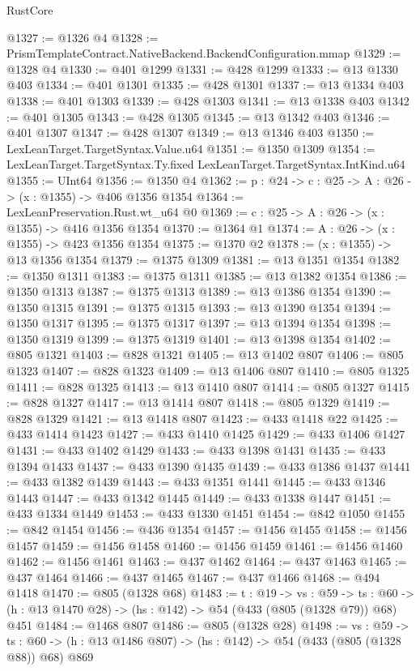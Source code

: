 \begin{lexlean}{RustCore}
\begin{coremodule}
@1327 := @1326 @4
@1328 := PrismTemplateContract.NativeBackend.BackendConfiguration.mmap
@1329 := @1328 @4
@1330 := @401 @1299
@1331 := @428 @1299
@1333 := @13 @1330 @403
@1334 := @401 @1301
@1335 := @428 @1301
@1337 := @13 @1334 @403
@1338 := @401 @1303
@1339 := @428 @1303
@1341 := @13 @1338 @403
@1342 := @401 @1305
@1343 := @428 @1305
@1345 := @13 @1342 @403
@1346 := @401 @1307
@1347 := @428 @1307
@1349 := @13 @1346 @403
@1350 := LexLeanTarget.TargetSyntax.Value.u64
@1351 := @1350 @1309
@1354 := LexLeanTarget.TargetSyntax.Ty.fixed LexLeanTarget.TargetSyntax.IntKind.u64
@1355 := UInt64
@1356 := @1350 @4
@1362 := {p : @24} -> {c : @25} -> {A : @26} -> (x : @1355) -> @406 @1356 @1354
@1364 := LexLeanPreservation.Rust.wt_u64 @0
@1369 := {c : @25} -> {A : @26} -> (x : @1355) -> @416 @1356 @1354
@1370 := @1364 @1
@1374 := {A : @26} -> (x : @1355) -> @423 @1356 @1354
@1375 := @1370 @2
@1378 := (x : @1355) -> @13 @1356 @1354
@1379 := @1375 @1309
@1381 := @13 @1351 @1354
@1382 := @1350 @1311
@1383 := @1375 @1311
@1385 := @13 @1382 @1354
@1386 := @1350 @1313
@1387 := @1375 @1313
@1389 := @13 @1386 @1354
@1390 := @1350 @1315
@1391 := @1375 @1315
@1393 := @13 @1390 @1354
@1394 := @1350 @1317
@1395 := @1375 @1317
@1397 := @13 @1394 @1354
@1398 := @1350 @1319
@1399 := @1375 @1319
@1401 := @13 @1398 @1354
@1402 := @805 @1321
@1403 := @828 @1321
@1405 := @13 @1402 @807
@1406 := @805 @1323
@1407 := @828 @1323
@1409 := @13 @1406 @807
@1410 := @805 @1325
@1411 := @828 @1325
@1413 := @13 @1410 @807
@1414 := @805 @1327
@1415 := @828 @1327
@1417 := @13 @1414 @807
@1418 := @805 @1329
@1419 := @828 @1329
@1421 := @13 @1418 @807
@1423 := @433 @1418 @22
@1425 := @433 @1414 @1423
@1427 := @433 @1410 @1425
@1429 := @433 @1406 @1427
@1431 := @433 @1402 @1429
@1433 := @433 @1398 @1431
@1435 := @433 @1394 @1433
@1437 := @433 @1390 @1435
@1439 := @433 @1386 @1437
@1441 := @433 @1382 @1439
@1443 := @433 @1351 @1441
@1445 := @433 @1346 @1443
@1447 := @433 @1342 @1445
@1449 := @433 @1338 @1447
@1451 := @433 @1334 @1449
@1453 := @433 @1330 @1451
@1454 := @842 @1050
@1455 := @842 @1454
@1456 := @436 @1354
@1457 := @1456 @1455
@1458 := @1456 @1457
@1459 := @1456 @1458
@1460 := @1456 @1459
@1461 := @1456 @1460
@1462 := @1456 @1461
@1463 := @437 @1462
@1464 := @437 @1463
@1465 := @437 @1464
@1466 := @437 @1465
@1467 := @437 @1466
@1468 := @494 @1418
@1470 := @805 (@1328 @68)
@1483 := {t : @19} ->
  {vs : @59} ->
  {ts : @60} -> (h : @13 @1470 @28) -> (hs : @142) -> @54 (@433 (@805 (@1328 @79)) @68) @451
@1484 := @1468 @807
@1486 := @805 (@1328 @28)
@1498 := {vs : @59} ->
  {ts : @60} -> (h : @13 @1486 @807) -> (hs : @142) -> @54 (@433 (@805 (@1328 @88)) @68) @869

\end{coremodule}
\end{lexlean}
